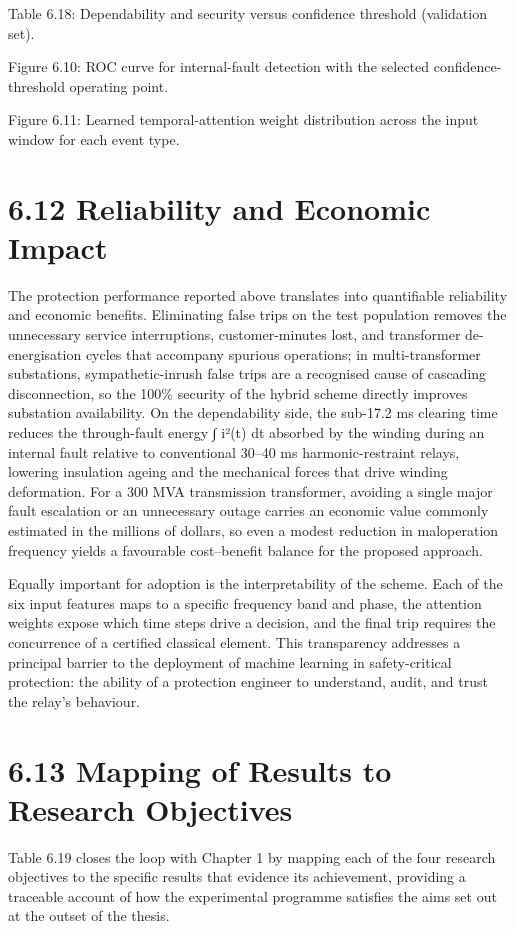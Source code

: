 Table 6.18: Dependability and security versus confidence threshold (validation set).

Figure 6.10: ROC curve for internal-fault detection with the selected confidence-threshold operating point.

Figure 6.11: Learned temporal-attention weight distribution across the input window for each event type.


\section{6.12  Reliability and Economic Impact}
The protection performance reported above translates into quantifiable reliability and economic benefits. Eliminating false trips on the test population removes the unnecessary service interruptions, customer-minutes lost, and transformer de-energisation cycles that accompany spurious operations; in multi-transformer substations, sympathetic-inrush false trips are a recognised cause of cascading disconnection, so the 100\% security of the hybrid scheme directly improves substation availability. On the dependability side, the sub-17.2 ms clearing time reduces the through-fault energy ∫ i²(t) dt absorbed by the winding during an internal fault relative to conventional 30--40 ms harmonic-restraint relays, lowering insulation ageing and the mechanical forces that drive winding deformation. For a 300 MVA transmission transformer, avoiding a single major fault escalation or an unnecessary outage carries an economic value commonly estimated in the millions of dollars, so even a modest reduction in maloperation frequency yields a favourable cost--benefit balance for the proposed approach.

Equally important for adoption is the interpretability of the scheme. Each of the six input features maps to a specific frequency band and phase, the attention weights expose which time steps drive a decision, and the final trip requires the concurrence of a certified classical element. This transparency addresses a principal barrier to the deployment of machine learning in safety-critical protection: the ability of a protection engineer to understand, audit, and trust the relay's behaviour.


\section{6.13  Mapping of Results to Research Objectives}
Table 6.19 closes the loop with Chapter 1 by mapping each of the four research objectives to the specific results that evidence its achievement, providing a traceable account of how the experimental programme satisfies the aims set out at the outset of the thesis.

